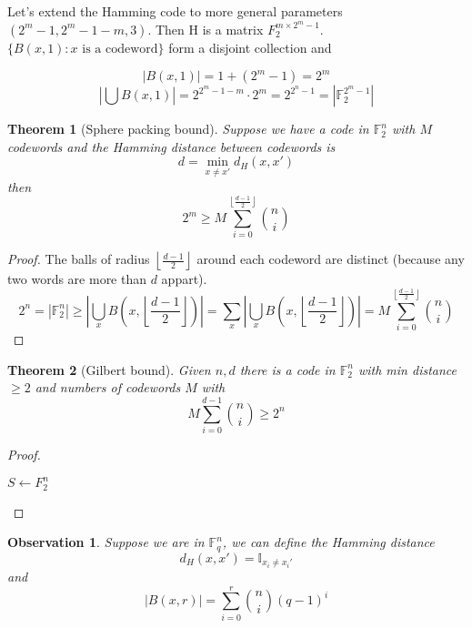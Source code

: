\documentclass{article}
\newtheorem{theorem}{Theorem}[section]
\newtheorem{observation}{Observation}[section]
\theoremstyle{definition} %
\def\F{\mathbb{F}}
\def\I{\mathbb{I}}
\begin{document}
Let's extend the Hamming code to more general parameters $(2^{m}-1, 2^m - 1 - m, 3)$. Then H is a matrix $F_2^{m\times2^m-1}$.$\{B(x,1) : x \text{ is a codeword}\}$ form a disjoint collection and

\[
  |B(x,1)| = 1 + (2^m - 1) = 2^m
\]
\[
  | \bigcup B(x,1) | = 2^{2^m - 1 - m} \cdot 2^m = 2^{2^n -1} = | \F_2^{2^m - 1} |
\]

\begin{theorem}[Sphere packing bound]
  Suppose we have a code in $\F_2^n$ with $M$ codewords and the Hamming distance between codewords is
  \[
    d = \min_{x\not=x'} d_H(x,x')
  \]
  then
  \[
    2^m \geq M \sum_{i=0}^{\left\lfloor \frac {d-1} 2 \right \rfloor} {n \choose i}
  \]
\end{theorem}

\begin{proof}
  The balls of radius $\left\lfloor \frac {d-1} 2 \right \rfloor$ around each codeword are distinct (because any two words are more than $d$ appart).
  \[
    2^n
    = |\F_2^n| \geq \left| \bigcup_x B\left(x, \left\lfloor \frac {d-1} 2 \right \rfloor\right) \right|
    = \sum_x \left| \bigcup_x B\left(x, \left\lfloor \frac {d-1} 2 \right \rfloor\right) \right|
    = M \sum_{i=0}^{\left\lfloor \frac {d-1} 2 \right \rfloor} {n \choose i}
  \]
\end{proof}

\begin{theorem}[Gilbert bound]
  Given $n,d$ there is a code in $\F_2^n$ with min distance $\geq 2$ and numbers of codewords $M$ with
  \[
    M\sum_{i=0}^{d-1} {n \choose i} \geq 2^n
  \]
\end{theorem}

\begin{proof}~\\
  \begin{algorithm}[H]
 $S \leftarrow F_2^n$\;
\end{algorithm}
\end{proof}

\begin{observation}
  Suppose we are in $\F_q^n$, we can define the Hamming distance
  \[
    d_H(x, x') = \I_{x_i \not = x_i'}
  \]
  and
  \[
      |B(x,r)| = \sum_{i=0}^r {n \choose i} (q-1)^i
    \]
\end{observation}
\end{document}
